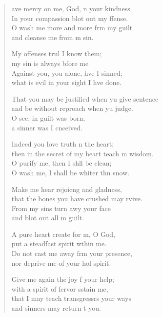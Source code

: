 \begin{verse}
  \begin{patverse}
ave mercy on me, God, \pointup{\i}n your kindness.\Med\\
In your compassion blot out my ffense.\\
O wash me more and more frm my guilt\Med\\
and cleanse me from m sin.

My offenses trul I know them;\Med\\
my sin is always bfore me\\
Against you, you alone, hve I sinned;\Med\\
what is evil in your sight I hve done.

That you may be justified when yu give sentence\Med\\
and be without reproach when yu judge.\\
O see, in guilt \pointup{\i} was born,\Med\\
a sinner was I cnceived.

Indeed you love truth \pointup{\i}n the heart;\Med\\
then in the secret of my heart teach m wisdom.\\
O purify me, then I shll be clean;\Med\\
O wash me, I shall be whiter thn snow.

Make me hear rejoic\pointup{\i}ng and gladness,\Med\\
that the bones you have crushed may rvive.\\
From my sins turn awy your face\Med\\
and blot out all m guilt.

A pure heart create for m, O God,\Med\\
put a steadfast spirit w\pointup{\i}thin me.\\
Do not cast me away frm your presence,\Med\\
nor deprive me of your hol spirit.

Give me again the joy f your help;\Med\\
with a spirit of fervor sstain me,\\
that I may teach transgressrs your ways\Med\\
and sinners may return t you.


\end{patverse}
\end{verse}

